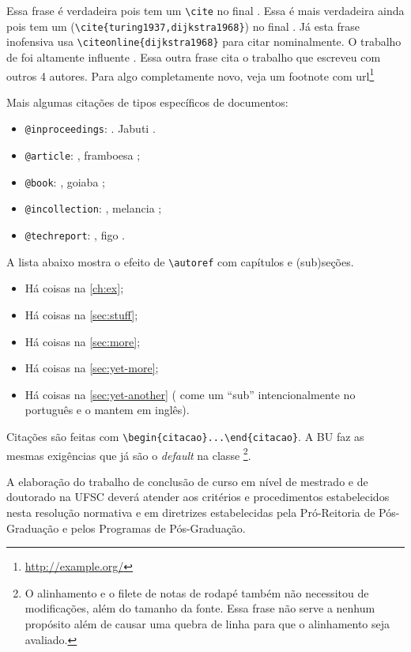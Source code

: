 \documentclass[embeddedlogo]{ufsc-thesis-rn46-2019}
\newcommand{\lacmd}[1]{\texttt{\textbackslash{}#1}}
\newcommand{\laenv}[1]{\texttt{\textbackslash{}begin\{#1\}...\textbackslash{}end\{#1\}}}
\begin{document}
Essa frase é verdadeira pois tem um \lacmd{cite} no final \cite{turing1937}. Essa
é mais verdadeira ainda pois tem um (\lacmd{cite\{turing1937,dijkstra1968\}}) no
final \cite{turing1937,dijkstra1968}. Já esta frase inofensiva usa
\lacmd{citeonline\{dijkstra1968\}} para citar 
nominalmente. O trabalho de  foi altamente influente
\cite{diffie1976}. Essa outra frase cita o trabalho que 
escreveu com outros 4 autores. Para algo completamente novo, veja um footnote
com url\footnote{\url{http://example.org/}}

Mais algumas citações de tipos específicos de documentos:
\begin{itemize}
\item \texttt{@inproceedings}: . Jabuti
  \cite{Ullman1989magic}.
\item \texttt{@article}: , framboesa \cite{Distefano2019};
\item \texttt{@book}: , goiaba \cite{Abiteboul1995};
\item \texttt{@incollection}: , melancia \cite{Forgy1989};
\item \texttt{@techreport}: , figo \cite{rdf11}.
\end{itemize}

A lista abaixo mostra o efeito de \lacmd{autoref{}} com capítulos e (sub)seções.

\begin{itemize}
\item Há coisas na \autoref{ch:ex};
\item Há coisas na \autoref{sec:stuff};
\item Há coisas na \autoref{sec:more};
\item Há coisas na \autoref{sec:yet-more};
\item Há coisas na \autoref{sec:yet-another} (\abnTeX{} come um ``sub''
  intencionalmente no português e o mantem em inglês).
\end{itemize}

Citações são feitas com \laenv{citacao}. A BU faz as mesmas exigências que já
são o \textit{default} na classe \abnTeX\footnote{O alinhamento e o filete de
  notas de rodapé também não necessitou de modificações, além do tamanho da
  fonte. Essa frase não serve a nenhum propósito além de causar uma quebra de
  linha para que o alinhamento seja avaliado.}.

\begin{citacao}
  A elaboração do trabalho de conclusão de curso em nível de mestrado
  e de doutorado na UFSC deverá atender aos critérios e procedimentos
  estabelecidos nesta resolução normativa e em diretrizes
  estabelecidas pela Pró-Reitoria de Pós-Graduação e pelos Programas
  de Pós-Graduação.
\end{citacao}
\end{document}

